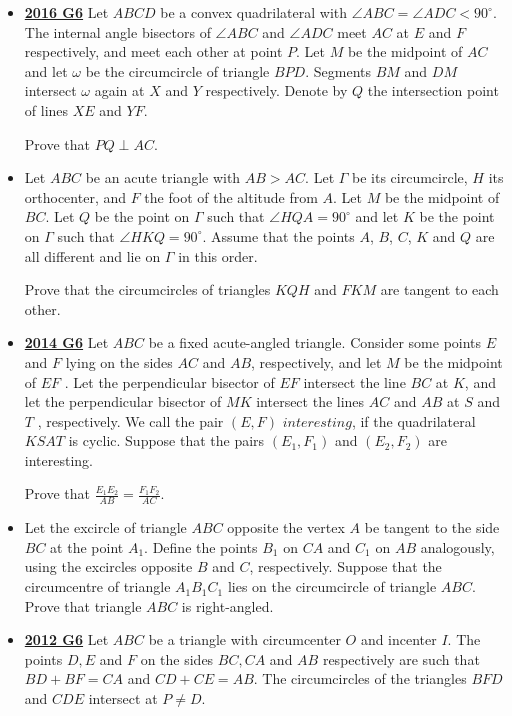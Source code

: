 \documentclass[11pt]{scrartcl}
\begin{document}
\begin{itemize}[leftmargin=*]
\item \href{https://artofproblemsolving.com/community/c6h1480719p8639316}{\textbf{2016 G6}} 	Let $ABCD$ be a convex quadrilateral with $\angle ABC = \angle ADC < 90^{\circ}$. The internal angle bisectors of $\angle ABC$ and $\angle ADC$ meet $AC$ at $E$ and $F$ respectively, and meet each other at point $P$. Let $M$ be the midpoint of $AC$ and let $\omega$ be the circumcircle of triangle $BPD$. Segments $BM$ and $DM$ intersect $\omega$ again at $X$ and $Y$ respectively. Denote by $Q$ the intersection point of lines $XE$ and $YF$. 

Prove that $PQ \perp AC$.
\item {}  Let $ABC$ be an acute triangle with $AB > AC$. Let $\Gamma $ be its circumcircle, $H$ its orthocenter, and $F$ the foot of the altitude from $A$. Let $M$ be the midpoint of $BC$. Let $Q$ be the point on $\Gamma$ such that $\angle HQA = 90^{\circ}$ and let $K$ be the point on $\Gamma$ such that $\angle HKQ = 90^{\circ}$. Assume that the points $A$, $B$, $C$, $K$ and $Q$ are all different and lie on $\Gamma$ in this order. 

Prove that the circumcircles of triangles $KQH$ and $FKM$ are tangent to each other.
\item \href{https://artofproblemsolving.com/community/c6h1113193p5083563}{\textbf{2014 G6}} Let $ABC$ be a fixed acute-angled triangle. Consider some points $E$ and $F$ lying on the sides $AC$ and $AB$, respectively, and let $M$ be the midpoint of $EF$ . Let the perpendicular bisector of $EF$ intersect the line $BC$ at $K$, and let the perpendicular bisector of $MK$ intersect the lines $AC$ and $AB$ at $S$ and $T$ , respectively. We call the pair $(E, F )$ $\textit{interesting}$, if the quadrilateral $KSAT$ is cyclic. Suppose that the pairs $(E_1 , F_1 )$ and $(E_2 , F_2 )$ are interesting. 

Prove that $\displaystyle \frac{E_1 E_2}{AB}=\frac{F_1 F_2}{AC}$.
\item {}  Let the excircle of triangle $ABC$ opposite the vertex $A$ be tangent to the side $BC$ at the point $A_1$. Define the points $B_1$ on $CA$ and $C_1$ on $AB$ analogously, using the excircles opposite $B$ and $C$, respectively. Suppose that the circumcentre of triangle $A_1B_1C_1$ lies on the circumcircle of triangle $ABC$. Prove that triangle $ABC$ is right-angled.
\item \href{https://artofproblemsolving.com/community/c6h546182p3160589}{\textbf{2012 G6}} Let $ABC$ be a triangle with circumcenter $O$ and incenter $I$. The points $D,E$ and $F$ on the sides $BC,CA$ and $AB$ respectively are such that $BD+BF=CA$ and $CD+CE=AB$. The circumcircles of the triangles $BFD$ and $CDE$ intersect at $P \neq D$. 


\end{itemize}
\end{document}
